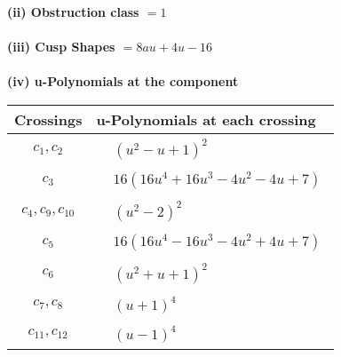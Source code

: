 \documentclass[1p]{elsarticle_modified}
\theoremstyle{definition}
\begin{document}
\flushleft \textbf{(ii) Obstruction class $= 1$}\\~\\
\flushleft \textbf{(iii) Cusp Shapes $= 8 a u+4 u-16$}\\~\\
\newpage\renewcommand{\arraystretch}{1}
\flushleft \textbf{(iv) u-Polynomials at the component}\newline \\
\begin{tabular}{m{50pt}|m{274pt}}
Crossings & \hspace{64pt}u-Polynomials at each crossing \\
\hline $$\begin{aligned}c_{1},c_{2}\end{aligned}$$&$\begin{aligned}
&(u^2- u+1)^2
\end{aligned}$\\
\hline $$\begin{aligned}c_{3}\end{aligned}$$&$\begin{aligned}
&16(16 u^4+16 u^3-4 u^2-4 u+7)
\end{aligned}$\\
\hline $$\begin{aligned}c_{4},c_{9},c_{10}\end{aligned}$$&$\begin{aligned}
&(u^2-2)^2
\end{aligned}$\\
\hline $$\begin{aligned}c_{5}\end{aligned}$$&$\begin{aligned}
&16(16 u^4-16 u^3-4 u^2+4 u+7)
\end{aligned}$\\
\hline $$\begin{aligned}c_{6}\end{aligned}$$&$\begin{aligned}
&(u^2+u+1)^2
\end{aligned}$\\
\hline $$\begin{aligned}c_{7},c_{8}\end{aligned}$$&$\begin{aligned}
&(u+1)^4
\end{aligned}$\\
\hline $$\begin{aligned}c_{11},c_{12}\end{aligned}$$&$\begin{aligned}
&(u-1)^4
\end{aligned}$\\
\hline
\end{tabular}\\~\\
\end{document}
